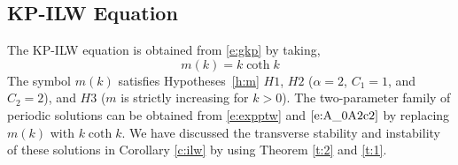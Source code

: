 \documentclass[12pt]{amsart}    %
\newtheorem{corollary}[theorem]{Corollary}
\numberwithin{equation}{section}
\begin{document}



\subsection{KP-ILW Equation}\label{ss:3}
The KP-ILW equation is obtained from \eqref{e:gkp} by taking,
\[
m(k)= k \coth{k}
\]
The symbol $m(k)$ satisfies Hypotheses~\ref{h:m} $H1$, $H2$ ($\alpha=2$, $C_1=1$, and $C_2=2$), and $H3$ ($m$ is strictly increasing for $k>0$). 
The two-parameter family of periodic solutions can be obtained from \eqref{e:expptw} and $\eqref{e:A_0A2c2}$ by replacing $m(k)$ with $k \coth{k}$. We have discussed the transverse stability and instability of these solutions in Corollary \ref{c:ilw} by using Theorem \ref{t:2} and \ref{t:1}.

\end{document}
